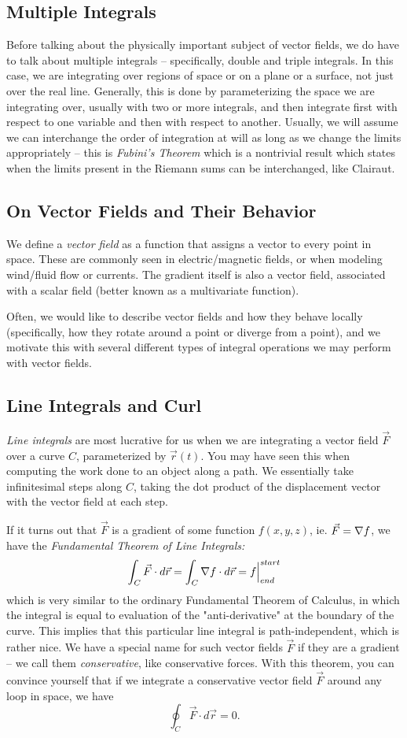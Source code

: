 \subsection{Multiple Integrals}
Before talking about the physically important subject of vector fields, we do have to talk about multiple integrals -- specifically, double and triple integrals. In this case, we are integrating over regions of space or on a plane or a surface, not just over the real line. Generally, this is done by parameterizing the space we are integrating over, usually with two or more integrals, and then integrate first with respect to one variable and then with respect to another. Usually, we will assume we can interchange the order of integration at will as long as we change the limits appropriately -- this is \textit{Fubini's Theorem} which is a nontrivial result which states when the limits present in the Riemann sums can be interchanged, like Clairaut.  

\subsection{On Vector Fields and Their Behavior}
We define a \textit{vector field} as a function that assigns a vector to every point in space. These are commonly seen in electric/magnetic fields, or when modeling wind/fluid flow or currents. The gradient itself is also a vector field, associated with a scalar field (better known as a multivariate function). 

Often, we would like to describe vector fields and how they behave locally (specifically, how they rotate around a point or diverge from a point), and we motivate this with several different types of integral operations we may perform with vector fields. 

\subsection{Line Integrals and Curl}
\textit{Line integrals} are most lucrative for us when we are integrating a vector field $\vec F$ over a curve $C$, parameterized by $\vec r(t)$. You may have seen this when computing the work done to an object along a path. We essentially take infinitesimal steps along $C$, taking the dot product of the displacement vector with the vector field at each step. 

If it turns out that $\vec F$ is a gradient of some function $f(x, y, z)$, ie. $\vec F = \nabla f$, we have the \textit{Fundamental Theorem of Line Integrals:}
\[
	\int_C \vec F \cdot d\vec r = \int_C \nabla f \cdot d\vec r = f\Big|_{end}^{start}
\]	
which is very similar to the ordinary Fundamental Theorem of Calculus, in which the integral is equal to evaluation of the "anti-derivative" at the boundary of the curve. This implies that this particular line integral is path-independent, which is rather nice. We have a special name for such vector fields $\vec F$ if they are a gradient -- we call them \textit{conservative}, like conservative forces. With this theorem, you can convince yourself that if we integrate a conservative vector field $\vec F$ around any loop in space, we have
\[
	\oint_C \vec F \cdot d\vec r = 0. 
\]

